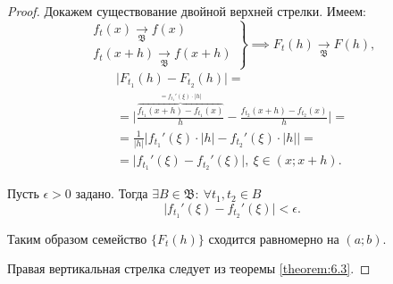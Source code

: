 \begin{proof}
    Докажем существование двойной верхней стрелки. Имеем:
    \[
        \left.\begin{array}{c}
            f_t(x) \xrightarrow[\mathfrak{B}]{} f(x) \\
            f_t(x + h) \xrightarrow[\mathfrak{B}]{} f(x+h)
        \end{array}\right\} \implies F_t(h) \xrightarrow[\mathfrak{B}]{} F(h),
    \]
    \begin{multline*}
        \big|F_{t_1}(h) - F_{t_2}(h)\big| = \\
        = \bigg| \frac{\overbrace{f_{t_1}(x + h) - f_{t_1}(x)}^{= f_{t_1}'(\xi) \cdot |h|}}{h} - \frac{f_{t_2}(x+h) - f_{t_2}(x)}{h}\bigg| = \\
        = \frac{1}{|h|}\big|f_{t_1}'(\xi) \cdot |h| - f_{t_2}'(\xi)\cdot |h| \big| = \\
        = \big|f_{t_1}'(\xi) - f_{t_2}'(\xi)\big|, \ \xi \in (x;x+h).
    \end{multline*}

    Пусть $\epsilon > 0$ задано. Тогда $\exists B \in \mathfrak{B}: \ \forall t_1,t_2 \in B$
    \[
        \big|f_{t_1}'(\xi) - f_{t_2}'(\xi)\big| < \epsilon.
    \]

    Таким образом семейство $\big\{F_t(h)\big\}$ сходится равномерно на $(a;b)$.

    Правая вертикальная стрелка следует из теоремы \ref{theorem:6.3}.
\end{proof}